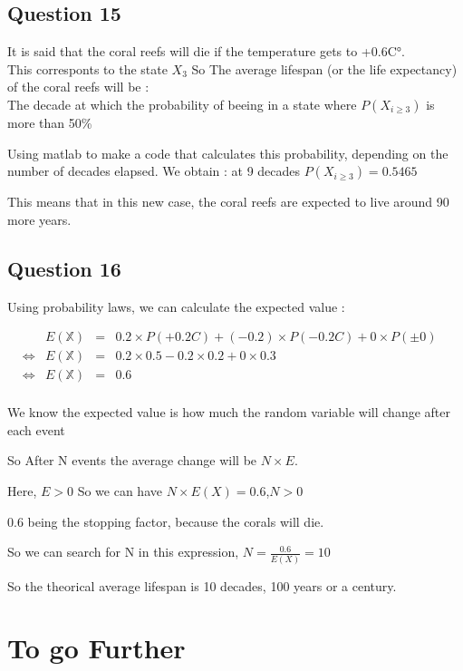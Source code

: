 \documentclass{article}
\begin{document}
    \subsection*{Question 15}

    It is said that the coral reefs will die if the temperature gets to +0.6C°.
    \\This corresponts to the state $X_3$
    So The average lifespan (or the life expectancy) of the coral reefs will be :\\
    The decade at which the probability of beeing in a state where $P(X_{i\geq3})$ is more than 50\%
    
    Using matlab to make a code that calculates this probability, depending on the number of decades elapsed.
    We obtain : at 9 decades $P(X_{i\geq3}) = 0.5465$
    
    This means that in this new case, the coral reefs are expected to live around 90 more years.

    \subsection*{Question 16}
    
    Using probability laws, we can calculate the expected value :

    $\begin{array}{lllll}
       &                 & E(\mathbb{X}) &= & 0.2\times P(+0.2C) +(-0.2)\times P(-0.2C) + 0\times P(\pm 0)\\
       & \Leftrightarrow & E(\mathbb{X}) &= & 0.2\times 0.5 - 0.2\times 0.2 + 0\times 0.3 \\
       & \Leftrightarrow & E(\mathbb{X}) &= & 0.6 \\
    \end{array}$

    We know the expected value is how much the random variable will change after each event
    
    So After N events the average change will be $N\times E$.

    Here, $E>0$ So we can have $N\times E(X)=0.6$,$N>0$ 

    0.6 being the stopping factor, because the corals will die.

    So we can search for N in this expression, $N= \frac{0.6}{E(X)} = 10$

    So the theorical average lifespan is 10 decades, 100 years or a century.


    \section*{To go Further}
\end{document}
